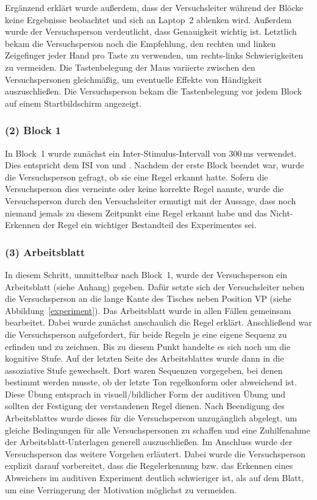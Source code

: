 \documentclass[doc,a4paper,12pt]{apa6}
\begin{document}
Ergänzend erklärt wurde außerdem, dass der Versuchsleiter während der Blöcke keine Ergebnisse beobachtet und sich an Laptop~2 ablenken wird. Außerdem wurde der Versuchsperson verdeutlicht, dass Genauigkeit wichtig ist. Letztlich bekam die Versuchsperson noch die Empfehlung, den rechten und linken Zeigefinger jeder Hand pro Taste zu verwenden, um rechts-links Schwierigkeiten zu vermeiden. Die Tastenbelegung der Maus variierte zwischen den Versuchspersonen gleichmäßig, um eventuelle Effekte von Händigkeit auszuschließen. Die Versuchsperson bekam die Tastenbelegung vor jedem Block auf einem Startbildschirm angezeigt.

\subsubsection{(2) Block 1}

In Block~1 wurde zunächst ein Inter-Stimulus-Intervall von 300\,ms verwendet. Dies entspricht dem ISI von \textcite{paavilainen2007preattentive} und \textcite{bendixen2008rapid}. Nachdem der erste Block beendet war, wurde die Versuchsperson gefragt, ob sie eine Regel erkannt hatte. Sofern die Versuchsperson dies verneinte oder keine korrekte Regel nannte, wurde die Versuchsperson durch den Versuchsleiter ermutigt mit der Aussage, dass noch niemand jemals zu diesem Zeitpunkt eine Regel erkannt habe und das Nicht-Erkennen der Regel ein wichtiger Bestandteil des Experimentes sei.

\subsubsection{(3) Arbeitsblatt}

In diesem Schritt, unmittelbar nach Block~1, wurde der Versuchsperson ein Arbeitsblatt (siehe Anhang) gegeben. Dafür setzte sich der Versuchsleiter neben die Versuchsperson an die lange Kante des Tisches neben Position VP (siehe Abbildung~\ref{experiment}). Das Arbeitsblatt wurde in allen Fällen gemeinsam bearbeitet. Dabei wurde zunächst anschaulich die Regel erklärt. Anschließend war die Versuchsperson aufgefordert, für beide Regeln je eine eigene Sequenz zu erfinden und zu zeichnen. Bis zu diesem Punkt handelte es sich noch um die kognitive Stufe. Auf der letzten Seite des Arbeitsblattes wurde dann in die assoziative Stufe gewechselt. Dort waren Sequenzen vorgegeben, bei denen bestimmt werden musste, ob der letzte Ton regelkonform oder abweichend ist. Diese Übung entsprach in visuell/bildlicher Form der auditiven Übung und sollten der Festigung der verstandenen Regel dienen. Nach Beendigung des Arbeitsblattes wurde dieses für die Versuchsperson unzugänglich abgelegt, um gleiche Bedingungen für alle Versuchspersonen zu schaffen und eine Zuhilfenahme der Arbeitsblatt-Unterlagen generell auszuschließen. Im Anschluss wurde der Versuchsperson das weitere Vorgehen erläutert. Dabei wurde die Versuchsperson explizit darauf vorbereitet, dass die Regelerkennung bzw. das Erkennen eines Abweichers im auditiven Experiment deutlich schwieriger ist, als auf dem Blatt, um eine Verringerung der Motivation möglichst zu vermeiden.
\end{document}
